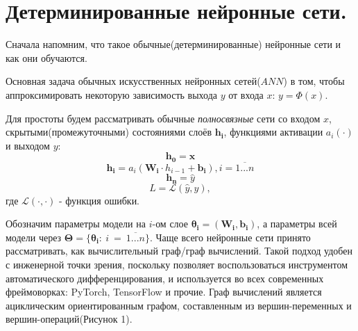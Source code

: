 \documentclass[14pt]{article}
\begin{document}
\section{Детерминированные нейронные сети.}

Сначала напомним, что такое обычные(детерминированные) нейронные сети и как они обучаются.

Основная задача обычных искусственных нейронных сетей($ANN$) в том, чтобы аппроксимировать некоторую зависимость выхода $y$ от
 входа $x$: $y = \Phi(x)$.

Для простоты будем рассматривать обычные \textit{полносвязные} сети со входом $x$,
 скрытыми(промежуточными) состояниями слоёв $\bm{h_i}$, функциями активации $a_i(\cdot)$ и выходом $y$:
$$\bm{h_0} = \bm{x}$$
$$\bm{h_i} = a_i(\bm{W_i} \cdot h_{i-1} + \bm{b_i}), i = \overline{1...n}$$
$$\bm{h_n} = \widehat{y}$$
$$L = \mathcal{L}(\widehat{y}, y),$$ где $\mathcal{L}(\cdot, \cdot)$ - функция ошибки.

Обозначим параметры модели на $i$-ом слое $\bm{\theta_i} = (\bm{W_i}, \bm{b_i})$, а параметры всей модели через $\bm{\Theta} = \{\bm{\theta_i} :~i~=~\overline{1...n}\}$.
Чаще всего нейронные сети принято рассматривать, как вычислительный граф/граф вычислений.
 Такой подход удобен с инженерной точки зрения, поскольку позволяет воспользоваться инструментом автоматического
 дифференцирования, и используется во всех современных фреймоворках: PyTorch, TensorFlow и прочие.
 Граф вычислений является ациклическим ориентированным графом, составленным из вершин-переменных и вершин-операций(Рисунок 1).
\begin{figure}[ht]
    \hfill
\end{figure}
\end{document}
